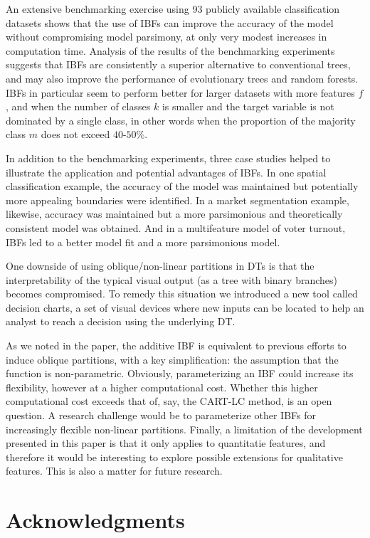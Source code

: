 \documentclass[]{elsarticle} %
\begin{document}
An extensive benchmarking exercise using 93 publicly available
classification datasets shows that the use of IBFs can improve the
accuracy of the model without compromising model parsimony, at only very
modest increases in computation time. Analysis of the results of the
benchmarking experiments suggests that IBFs are consistently a superior
alternative to conventional trees, and may also improve the performance
of evolutionary trees and random forests. IBFs in particular seem to
perform better for larger datasets with more features \(f\), and when
the number of classes \(k\) is smaller and the target variable is not
dominated by a single class, in other words when the proportion of the
majority class \(m\) does not exceed \(40\)-\(50\)\%.

In addition to the benchmarking experiments, three case studies helped
to illustrate the application and potential advantages of IBFs. In one
spatial classification example, the accuracy of the model was maintained
but potentially more appealing boundaries were identified. In a market
segmentation example, likewise, accuracy was maintained but a more
parsimonious and theoretically consistent model was obtained. And in a
multifeature model of voter turnout, IBFs led to a better model fit and
a more parsimonious model.

One downside of using oblique/non-linear partitions in DTs is that the
interpretability of the typical visual output (as a tree with binary
branches) becomes compromised. To remedy this situation we introduced a
new tool called decision charts, a set of visual devices where new
inputs can be located to help an analyst to reach a decision using the
underlying DT.

As we noted in the paper, the additive IBF is equivalent to previous
efforts to induce oblique partitions, with a key simplification: the
assumption that the function is non-parametric. Obviously,
parameterizing an IBF could increase its flexibility, however at a
higher computational cost. Whether this higher computational cost
exceeds that of, say, the CART-LC method, is an open question. A
research challenge would be to parameterize other IBFs for increasingly
flexible non-linear partitions. Finally, a limitation of the development
presented in this paper is that it only applies to quantitatie features,
and therefore it would be interesting to explore possible extensions for
qualitative features. This is also a matter for future research.

\section{Acknowledgments}\label{acknowledgments}
\end{document}
